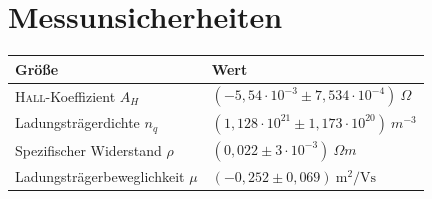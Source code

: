 \section{Messunsicherheiten}
\begin{table}[h]
    \centering
    \begin{tabular}{@{}ll@{}}
        \toprule
        Größe                                            & Wert                                                                    \\ \midrule
        \textsc{Hall}-Koeffizient $A_H$                  & \( (-5,54 \cdot 10^{-3} \pm 7,534 \cdot 10^{-4})\SI{}{\Omega}\)         \\
        Ladungsträgerdichte $n_q$                        & \( (1,128 \cdot 10^{21} \pm 1,173 \cdot 10^{20})\SI{}{m^{-3}}\)         \\
        Spezifischer Widerstand \(\rho\)                 & \( (0,022 \pm 3 \cdot 10^{-3})\SI{}{\Omega m} \)                        \\
        Ladungsträgerbeweglichkeit \(\mu\)               & \( (-0,252 \pm 0,069)\SI{}{\metre\squared\per\volt\second} \)                           \\ \bottomrule
    \end{tabular}
\end{table}